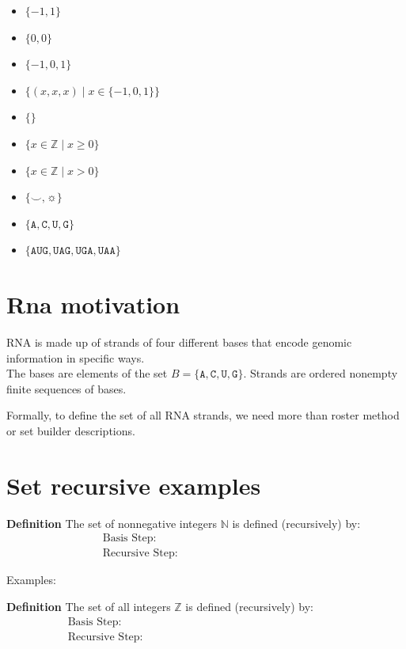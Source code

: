 \documentclass[12pt, oneside]{article}
\newcommand{\A}[0]{\texttt{A}}
\newcommand{\C}[0]{\texttt{C}}
\newcommand{\G}[0]{\texttt{G}}
\newcommand{\U}[0]{\texttt{U}}
\begin{document}
\begin{itemize}
    \item[]$\{ -1, 1\}$
    \vfill
    \item[]$\{0, 0 \}$
    \vfill
    \item[]$\{-1, 0, 1 \}$
    \vfill
    \item[]$\{(x,x,x) \mid x \in \{-1,0,1\} \}$
    \vfill
    \item[]$\{ \}$
    \vfill
    \item[]$\{ x \in \mathbb{Z} \mid x \geq 0 \}$
    \vfill
    \item[]$\{ x \in \mathbb{Z}  \mid x > 0 \}$
    \vfill
    \item[]$\{ \smile, \sun \}$
    \vfill
    \item[]$\{\A,\C,\U,\G\}$
    \vfill
    \item[]$\{\A\U\G, \U\A\G, \U\G\A, \U\A\A \}$
    \vfill
\end{itemize}
 \vfill
\section*{Rna motivation}


RNA is made up of strands of four different bases that encode genomic information
in specific ways.\\
The bases are elements of the set 
$B  = \{\A, \C, \U, \G \}$.
Strands are ordered nonempty finite sequences of bases.

Formally, to define the set of all RNA strands, we need more than roster
method or set builder descriptions. 

 \vfill
\section*{Set recursive examples}


{\bf Definition} The set of nonnegative integers $\mathbb{N}$ is defined (recursively) by: 
\[
\begin{array}{ll}
\textrm{Basis Step: } & \phantom{0 \in \mathbb{N}} \\
\textrm{Recursive Step: } & \phantom{\textrm{If } n \in \mathbb{N} \textrm{, then } n+1 \in \mathbb{N}}
\end{array}
\]

Examples: 

{\bf Definition} The set of all integers $\mathbb{Z}$ is defined (recursively) by: 
\[
\begin{array}{ll}
\textrm{Basis Step: } & \phantom{0 \in \mathbb{Z}} \\
\textrm{Recursive Step: } & \phantom{\textrm{If } x \in \mathbb{Z} \textrm{, then } x+1 \in \mathbb{Z}
\textrm{ and } x-1 \in \mathbb{Z}}
\end{array}
\]
\end{document}
